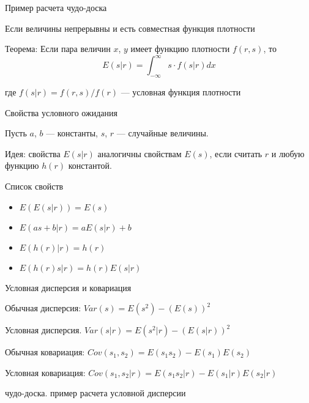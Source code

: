 \documentclass[ignorenonframetext,]{beamer}
\begin{document}
\begin{frame}{Пример расчета чудо-доска}

\end{frame}

\begin{frame}{Если величины непрерывны и есть совместная функция
плотности}

Теорема: Если пара величин $x$, $y$ имеет функцию плотности $f(r,s)$, то
\[
E(s|r)=\int_{-\infty}^{\infty} s \cdot f(s|r) dx
\]

где $f(s|r)=f(r,s)/f(r)$ --- условная функция плотности

\end{frame}

\begin{frame}{Свойства условного ожидания}

Пусть $a$, $b$ --- константы, $s$, $r$ --- случайные величины.

Идея: свойства $E(s|r)$ аналогичны свойствам $E(s)$, если считать $r$ и
любую функцию $h(r)$ константой.

\end{frame}

\begin{frame}{Список свойств}

\begin{itemize}
\item
  $E(E(s|r))=E(s)$
\item
  $E(as+b|r)=aE(s|r)+b$
\item
  $E(h(r)|r)=h(r)$
\item
  $E(h(r)s|r)=h(r)E(s|r)$
\end{itemize}

\end{frame}

\begin{frame}{Условная дисперсия и ковариация}

Обычная дисперсия: $Var(s)=E(s^2)-(E(s))^2$

Условная дисперсия. $Var(s|r)=E(s^2|r)-(E(s|r))^2$

Обычная ковариация: $Cov(s_1,s_2)=E(s_1 s_2)-E(s_1)E(s_2)$

Условная ковариация: $Cov(s_1,s_2|r)=E(s_1 s_2|r)-E(s_1|r)E(s_2|r)$

\end{frame}

\begin{frame}{чудо-доска. пример расчета условной дисперсии}

\end{frame}
\end{document}
